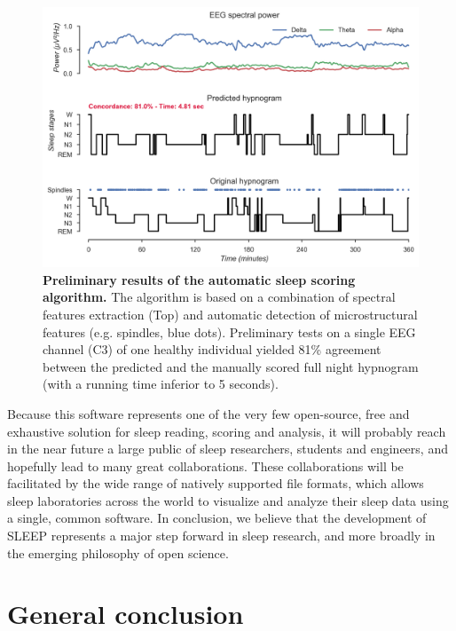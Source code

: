 \begin{figure}[htb]
	\includegraphics[width=\textwidth]{Fig/Discussion/autoscore.png}
	\caption[Preliminary results of the automatic sleep scoring algorithm]{\textbf{Preliminary results of the automatic sleep scoring algorithm.} The algorithm is based on a combination of spectral features extraction (Top) and automatic detection of microstructural features (e.g. spindles, blue dots). Preliminary tests on a single EEG channel (C3) of one healthy individual yielded 81\% agreement between the predicted and the manually scored full night hypnogram (with a running time inferior to 5 seconds).}
	\label{fig:disc:methods:future:autoscore}
\end{figure}

Because this software represents one of the very few open-source, free and exhaustive solution for sleep reading, scoring and analysis, it will probably reach in the near future a large public of sleep researchers, students and engineers, and hopefully lead to many great collaborations. These collaborations will be facilitated by the wide range of natively supported file formats, which allows sleep laboratories across the world to visualize and analyze their sleep data using a single, common software. In conclusion, we believe that the development of SLEEP represents a major step forward in sleep research, and more broadly in the emerging philosophy of open science.

\cleardoublepage
\chapter{General conclusion}
\label{disc:conclusion}


